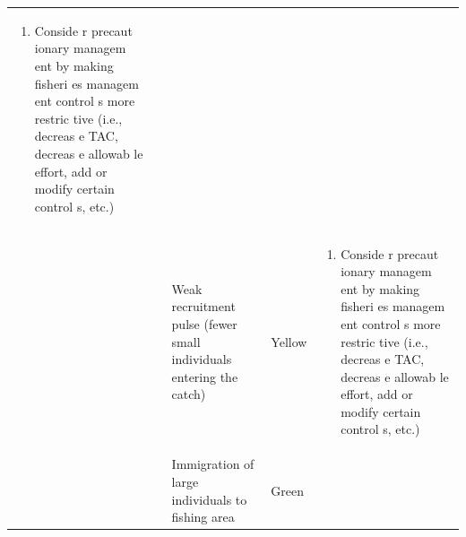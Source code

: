 \documentclass[]{book}
\providecommand{\tightlist}{%
  \setlength{\itemsep}{0pt}\setlength{\parskip}{0pt}}
\begin{document}
\begin{longtable}[]{@{}lllll@{}}
\begin{minipage}[t]{0.19\columnwidth}
\begin{enumerate}
\def\labelenumi{\arabic{enumi}.}
\setcounter{enumi}{1}
\tightlist
\item
  Conside r precaut ionary managem ent by making fisheri es managem ent
  control s more restric tive (i.e., decreas e TAC, decreas e allowab le
  effort, add or modify certain control s, etc.)
\end{enumerate}\strut
\end{minipage}\tabularnewline
\begin{minipage}[t]{0.19\columnwidth}\raggedright\strut
\strut
\end{minipage} & \begin{minipage}[t]{0.19\columnwidth}\raggedright\strut
\strut
\end{minipage} & \begin{minipage}[t]{0.19\columnwidth}\raggedright\strut
Weak recruitment pulse (fewer small individuals entering the
catch)\strut
\end{minipage} & \begin{minipage}[t]{0.19\columnwidth}\raggedright\strut
Yellow\strut
\end{minipage} & \begin{minipage}[t]{0.19\columnwidth}\raggedright\strut
\begin{enumerate}
\def\labelenumi{\arabic{enumi}.}
\tightlist
\item
  Conside r precaut ionary managem ent by making fisheri es managem ent
  control s more restric tive (i.e., decreas e TAC, decreas e allowab le
  effort, add or modify certain control s, etc.)
\end{enumerate}\strut
\end{minipage}\tabularnewline
\begin{minipage}[t]{0.19\columnwidth}\raggedright\strut
\strut
\end{minipage} & \begin{minipage}[t]{0.19\columnwidth}\raggedright\strut
\strut
\end{minipage} & \begin{minipage}[t]{0.19\columnwidth}\raggedright\strut
Immigration of large individuals to fishing area\strut
\end{minipage} & \begin{minipage}[t]{0.19\columnwidth}\raggedright\strut
Green\strut
\end{minipage} & \begin{minipage}[t]{0.19\columnwidth}\raggedright\strut
\begin{enumerate}

\end{enumerate}
\end{minipage}
\end{longtable}
\end{document}
